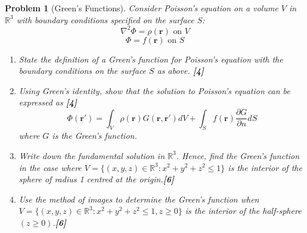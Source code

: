 \documentclass[a4paper]{article}
\theoremstyle{new}
\newtheorem{qns}{Problem}[section]
\begin{document}
\begin{qns}[Green's Functions]
Consider Poisson’s equation on a volume $V$ in $\mathbb{R}^3$ with boundary conditions specified on the surface $S$: 
$$\nabla^2\Phi=\rho(\mathbf{r})\text{ on  }V$$
$$\Phi=f(\mathbf{r})\text{ on }S$$
\begin{enumerate}[label=(\alph*)]
\item State the definition of a Green’s function for Poisson’s equation with the boundary conditions on the surface $S$ as above. \hfill\textbf{[4]}
\item Using Green’s identity, show that the solution to Poisson’s equation can be expressed as \hfill\textbf{[4]}
$$\Phi(\mathbf{r'})=\int_V\rho(\mathbf{r})G(\mathbf{r},\mathbf{r'})dV+\int_Sf(\mathbf{r})\frac{\partial G}{\partial n}dS$$
where $G$ is the Green’s function.
\item Write down the fundamental solution in $\mathbb{R}^3$. Hence, find the Green’s function in the case where $V = \{(x, y, z) \in\mathbb{R}^3: x^2 + y^2 + z^2\leq 1\}$ is the interior of the sphere of radius 1 centred at the origin.\hfill\textbf{[6]}
\item Use the method of images to determine the Green’s function when $V = \{(x, y, z)\in\mathbb{R}^3: x^2 + y^2 + z^2\leq 1, z \geq 0\}$ is the interior of the half-sphere $(z \geq 0)$.\hfill\textbf{[6]}
\end{enumerate}
\end{qns}
\newpage
\end{document}
